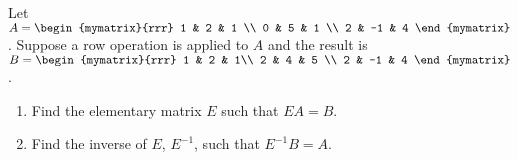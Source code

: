 \begin{enumialphparenastyle}
\begin{ex} 
Let $A = \begin{mymatrix}{rrr}
1 & 2 & 1  \\
0 & 5 & 1 \\
2 & -1 & 4
\end{mymatrix}$. Suppose a row operation is applied to $A$ and the result is $B = \begin{mymatrix}{rrr}
1 & 2 & 1\\
2 & 4 & 5 \\
2 & -1 & 4  
\end{mymatrix}$. 
\begin{enumerate}
\item Find the elementary matrix $E$ such that $EA = B$. 

\item Find the inverse of $E$, $E^{-1}$, such that $E^{-1}B = A$.
\end{enumerate}
\end{ex}

\end{enumialphparenastyle}

